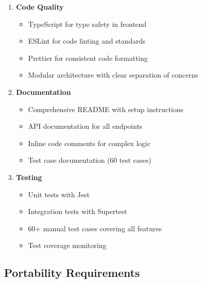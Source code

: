 \begin{enumerate}[leftmargin=*]
    \item \textbf{Code Quality}
    \begin{itemize}
        \item TypeScript for type safety in frontend
        \item ESLint for code linting and standards
        \item Prettier for consistent code formatting
        \item Modular architecture with clear separation of concerns
    \end{itemize}
    
    \item \textbf{Documentation}
    \begin{itemize}
        \item Comprehensive README with setup instructions
        \item API documentation for all endpoints
        \item Inline code comments for complex logic
        \item Test case documentation (60 test cases)
    \end{itemize}
    
    \item \textbf{Testing}
    \begin{itemize}
        \item Unit tests with Jest
        \item Integration tests with Supertest
        \item 60+ manual test cases covering all features
        \item Test coverage monitoring
    \end{itemize}
\end{enumerate}

\subsection{Portability Requirements}

